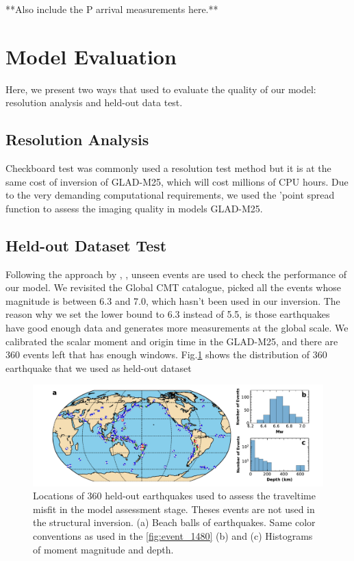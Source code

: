 \documentclass[extra,mreferee]{gji}
\begin{document}
**Also include the P arrival measurements here.**


\section{Model Evaluation}

Here, we present two ways that used to evaluate the quality of our model:
resolution analysis and held-out data test.

\subsection{Resolution Analysis}
Checkboard test was commonly used a resolution test method but it is at the
same cost of inversion of GLAD-M25, which will cost millions of CPU hours.
Due to the very demanding computational requirements, we used the 'point
spread function to assess the imaging quality in models GLAD-M25.

\subsection{Held-out Dataset Test}
Following the approach by \cite{tape2009adjoint}, \cite{bozdaug2016global},
unseen events are used to check the performance of our
model. We revisited the Global CMT catalogue,
picked all the events whose magnitude is between 6.3 and 7.0, which hasn't
been used in our inversion. The reason why we set the lower bound to 6.3
instead of 5.5, is those earthquakes have good enough data and generates
more measurements at the global scale.
We calibrated the scalar moment and origin time in the GLAD-M25, and there
are 360 events left that has enough windows. Fig.\ref{fig:events_360} shows
the distribution of 360 earthquake that we used as held-out dataset

\begin{figure}
  \centering
  \includegraphics[width=\textwidth]{figures/events_360.pdf}
  \caption{Locations of 360 held-out earthquakes used to assess the traveltime misfit in the model assessment stage. Theses events are not used in the structural inversion. (a) Beach balls of earthquakes. Same color conventions as used in the \ref{fig:event_1480} (b) and (c) Histograms of moment magnitude and depth.}
  \label{fig:events_360}
\end{figure}
\end{document}
